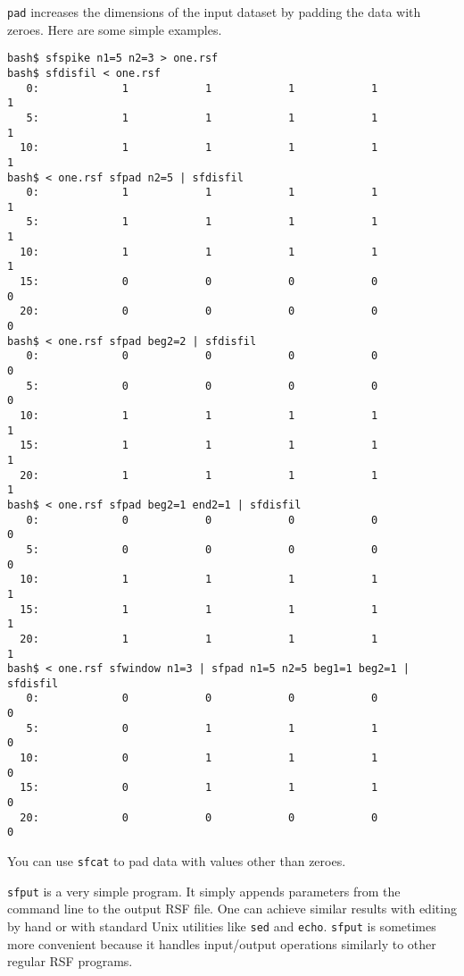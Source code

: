 \noindent\doublebox{\parbox{\textwidth}{
    
  }}

\texttt{pad} increases the dimensions of the input dataset by padding
the data with zeroes. Here are some simple examples.

\begin{verbatim}
bash$ sfspike n1=5 n2=3 > one.rsf
bash$ sfdisfil < one.rsf
   0:             1            1            1            1            1
   5:             1            1            1            1            1
  10:             1            1            1            1            1
bash$ < one.rsf sfpad n2=5 | sfdisfil
   0:             1            1            1            1            1
   5:             1            1            1            1            1
  10:             1            1            1            1            1
  15:             0            0            0            0            0
  20:             0            0            0            0            0
bash$ < one.rsf sfpad beg2=2 | sfdisfil
   0:             0            0            0            0            0
   5:             0            0            0            0            0
  10:             1            1            1            1            1
  15:             1            1            1            1            1
  20:             1            1            1            1            1
bash$ < one.rsf sfpad beg2=1 end2=1 | sfdisfil
   0:             0            0            0            0            0
   5:             0            0            0            0            0
  10:             1            1            1            1            1
  15:             1            1            1            1            1
  20:             1            1            1            1            1
bash$ < one.rsf sfwindow n1=3 | sfpad n1=5 n2=5 beg1=1 beg2=1 | sfdisfil
   0:             0            0            0            0            0
   5:             0            1            1            1            0
  10:             0            1            1            1            0
  15:             0            1            1            1            0
  20:             0            0            0            0            0
\end{verbatim}
You can use \texttt{sfcat} to pad data with values other than zeroes.

\noindent\doublebox{\parbox{\textwidth}{
    
  }}

\texttt{sfput} is a very simple program. It simply appends parameters
from the command line to the output RSF file. One can achieve similar
results with editing by hand or with standard Unix utilities like
\texttt{sed} and \texttt{echo}. \texttt{sfput} is sometimes more
convenient because it handles input/output operations similarly to
other regular RSF programs.

